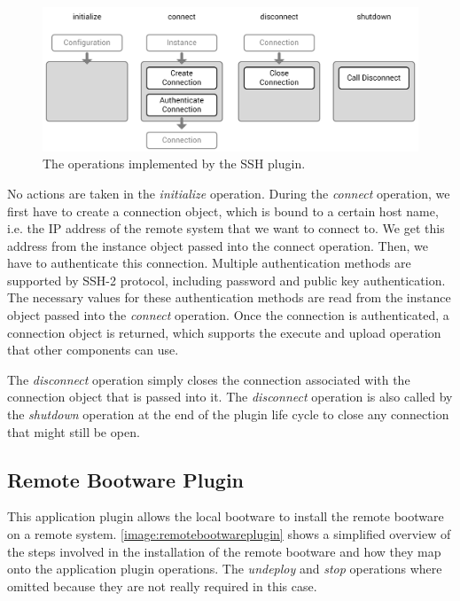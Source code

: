\begin{figure}[!htbp]
	\centering
	\includegraphics[resolution=600]{implementation/assets/ssh_plugin}
	\caption{The operations implemented by the SSH plugin.}
	\label{image:sshplugin}
\end{figure}

No actions are taken in the \textit{initialize} operation.
During the \textit{connect} operation, we first have to create a connection object, which is bound to a certain host name, i.e. the IP address of the remote system that we want to connect to.
We get this address from the instance object passed into the connect operation.
Then, we have to authenticate this connection.
Multiple authentication methods are supported by SSH-2 protocol, including password and public key authentication.
The necessary values for these authentication methods are read from the instance object passed into the \textit{connect} operation.
Once the connection is authenticated, a connection object is returned, which supports the execute and upload operation that other components can use.

The \textit{disconnect} operation simply closes the connection associated with the connection object that is passed into it.
The \textit{disconnect} operation is also called by the \textit{shutdown} operation at the end of the plugin life cycle to close any connection that might still be open.

\subsection{Remote Bootware Plugin}

This application plugin allows the local bootware to install the remote bootware on a remote system.
\autoref{image:remotebootwareplugin} shows a simplified overview of the steps involved in the installation of the remote bootware and how they map onto the application plugin operations.
The \textit{undeploy} and \textit{stop} operations where omitted because they are not really required in this case.

